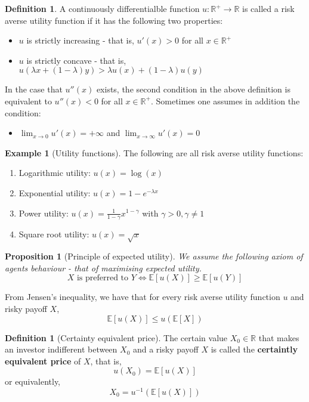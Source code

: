 \documentclass[10pt, oneside, reqno]{amsart}
\theoremstyle{plain}%
\newtheorem{prop}[thm]{Proposition}
\theoremstyle{definition}
\newtheorem{defn}[thm]{Definition}
\newtheorem{exmp}[thm]{Example}
\theoremstyle{remark}
\newcommand{\expc}[1]{\mathbb{E}\left[#1\right]}
\newcommand{\R}{\mathbb{R}}
\begin{document}
\begin{defn}A continuously differentialble function $u: \R^+ \rightarrow \R$ is called a risk averse utility function if it has the following two properties:
	\begin{itemize}
		\item $u$ is strictly increasing - that is, $u'(x) > 0$ for all $x \in \R^+$
		\item $u$ is strictly concave - that is, $u(\lambda x + (1-\lambda)y) > \lambda u(x) + (1-\lambda)u(y)$
	\end{itemize}
		In the case that $u''(x)$ exists, the second condition in the above definition is equivalent to $u''(x) < 0$ for all $x \in \R^+$.  Sometimes one assumes in addition the condition:
		\begin{itemize}
			\item $\lim_{x \rightarrow 0} u'(x) = +\infty$ and $\lim_{x \rightarrow \infty} u'(x) = 0$
		\end{itemize}
\end{defn}


\begin{exmp}[Utility functions]
	The following are all risk averse utility functions:
	\begin{enumerate}
		\item Logarithmic utility: $u(x) = \log(x)$
		\item Exponential utility: $u(x) = 1 - e^{-\lambda x}$
		\item Power utility: $u(x) = \frac{1}{1- \gamma}x^{1-\gamma}$ with $\gamma > 0, \gamma \neq 1$
		\item Square root utility: $u(x) = \sqrt{x}$
	\end{enumerate}
\end{exmp}

\begin{prop}[Principle of expected utility]
	We assume the following axiom of agents behaviour - that of maximising expected utility.\[
		X \text{ is preferred to } Y \iff \expc{u(X)} \geq \expc{u(Y)}
	\]
\end{prop}

From Jensen's inequality, we have that for every risk averse utility function $u$ and risky payoff $X$, \[
	\expc{u(X)} \leq u(\expc{X})
\]

\begin{defn}[Certainty equivalent price]
	The certain value $X_0 \in \R$ that makes an investor indifferent between $X_0$ and a risky payoff $X$ is called the \textbf{certaintly equivalent price} of $X$, that is, \[
		u(X_0) = \expc{u(X)}
	\] or equivalently, \[
		X_0 = u^{-1} \left(\expc{u(X)}\right)
	\]
\end{defn}
\end{document}
